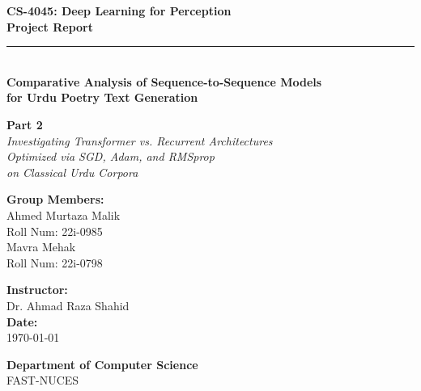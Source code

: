 \documentclass[12pt,a4paper]{article}
\begin{document}
\begin{titlepage}
    \centering
    \vspace*{1cm}
    
    {\huge\bfseries\color{primarycolor} CS-4045: Deep Learning for Perception}\\[0.5cm]
    
    {\Huge\bfseries Project Report}\\[0.5cm]
    \rule{\linewidth}{1mm}\\[0.5cm]
    
    {\LARGE\bfseries Comparative Analysis of Sequence-to-Sequence Models\\[0.2cm]
    for Urdu Poetry Text Generation}\\[2cm]
    
    \begin{tcolorbox}[
        colback=tableheadcolor,
        colframe=primarycolor,
        width=0.9\textwidth,
        boxrule=1pt,
        arc=4mm
    ]
        \centering
        \textbf{\large Part 2}\\[0.2cm]
        \textit{Investigating Transformer vs. Recurrent Architectures\\
        Optimized via SGD, Adam, and RMSprop\\
        on Classical Urdu Corpora}
    \end{tcolorbox}
    
    \vfill
    
    \begin{minipage}{0.45\textwidth}
        \begin{flushleft}
            \textbf{\color{primarycolor}Group Members:}\\
            \large Ahmed Murtaza Malik\\
            \small Roll Num: 22i-0985\\
            \large Mavra Mehak\\
            \small Roll Num: 22i-0798
        \end{flushleft}
    \end{minipage}
    \hfill
    \begin{minipage}{0.45\textwidth}
        \begin{flushright}
            \textbf{\color{primarycolor}Instructor:}\\
            \large Dr. Ahmad Raza Shahid\\[0.5cm]
            \textbf{\color{primarycolor}Date:}\\
            \small \today
        \end{flushright}
    \end{minipage}
    
    \vspace{1.5cm}
    {\large \textbf{Department of Computer Science}\\
    FAST-NUCES}
\end{titlepage}
\end{document}
